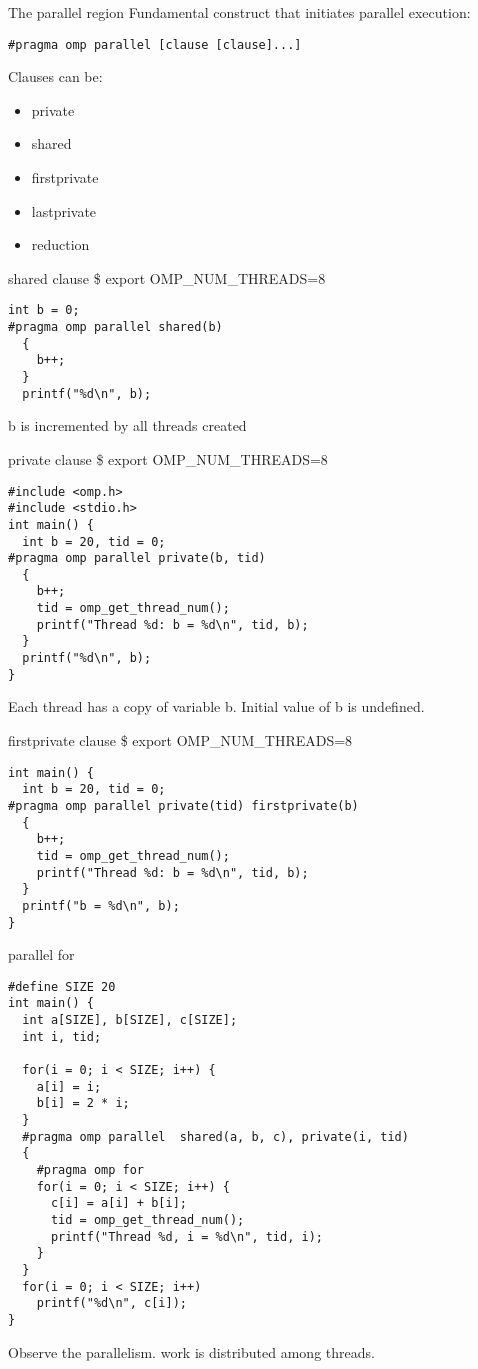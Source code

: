 \documentclass[10pt]{beamer}
\begin{document}
\begin{frame}[fragile]{The parallel region}
Fundamental construct that initiates parallel execution:
\begin{Verbatim}
#pragma omp parallel [clause [clause]...]
\end{Verbatim}
Clauses can be:
\begin{itemize}
\item private
\item shared
\item firstprivate
\item lastprivate
\item reduction
\end{itemize}
\end{frame}

\begin{frame}[fragile]{shared clause}
\$ export OMP\_NUM\_THREADS=8
\begin{Verbatim}[fontsize=\small, formatcom=\color{red}]
  int b = 0;
#pragma omp parallel shared(b)
  {
    b++;
  }
  printf("%d\n", b);
\end{Verbatim}
b is incremented by all threads created
\end{frame}

\begin{frame}[fragile]{private clause}
\$ export OMP\_NUM\_THREADS=8
\begin{Verbatim}[fontsize=\small, formatcom=\color{red}]
#include <omp.h>
#include <stdio.h>
int main() {
  int b = 20, tid = 0;
#pragma omp parallel private(b, tid)
  {
    b++;
    tid = omp_get_thread_num();
    printf("Thread %d: b = %d\n", tid, b);
  }
  printf("%d\n", b);
}
\end{Verbatim}
Each thread has a copy of variable b. Initial value of b is undefined.
\end{frame}

\begin{frame}[fragile]{firstprivate clause}
\$ export OMP\_NUM\_THREADS=8
\begin{Verbatim}[fontsize=\small, formatcom=\color{red}]
int main() {
  int b = 20, tid = 0;
#pragma omp parallel private(tid) firstprivate(b)
  {
    b++;
    tid = omp_get_thread_num();
    printf("Thread %d: b = %d\n", tid, b);
  }
  printf("b = %d\n", b);
}
\end{Verbatim}
\end{frame}

\begin{frame}[fragile]{parallel for}
\begin{Verbatim}[fontsize=\small, formatcom=\color{red}]
#define SIZE 20
int main() {        
  int a[SIZE], b[SIZE], c[SIZE];
  int i, tid;

  for(i = 0; i < SIZE; i++) {
    a[i] = i;
    b[i] = 2 * i;
  }
  #pragma omp parallel  shared(a, b, c), private(i, tid)
  {
    #pragma omp for
    for(i = 0; i < SIZE; i++) {
      c[i] = a[i] + b[i];
      tid = omp_get_thread_num();
      printf("Thread %d, i = %d\n", tid, i);
    }
  }
  for(i = 0; i < SIZE; i++)
    printf("%d\n", c[i]);
}
\end{Verbatim}
Observe the parallelism. work is distributed among threads.
\end{frame}
\end{document}
